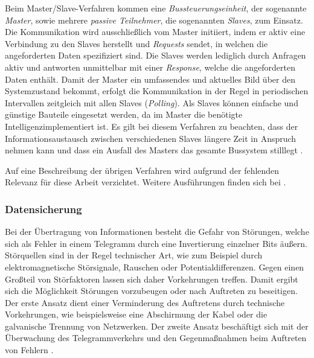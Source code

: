 Beim Master/Slave-Verfahren kommen eine \textit{Bussteuerungseinheit}, der sogenannte \textit{Master}, sowie mehrere \textit{passive Teilnehmer}, die sogenannten \textit{Slaves}, zum Einsatz.
Die Kommunikation wird ausschließlich vom Master initiiert, indem er aktiv eine Verbindung zu den Slaves herstellt und \textit{Requests} sendet, in welchen die angeforderten Daten spezifiziert sind.
Die Slaves werden lediglich durch Anfragen aktiv und antworten unmittelbar mit einer \textit{Response}, welche die angeforderten Daten enthält.
Damit der Master ein umfassendes und aktuelles Bild über den Systemzustand bekommt, erfolgt die Kommunikation in der Regel in periodischen Intervallen zeitgleich mit allen Slaves (\textit{Polling}). Als Slaves können einfache und günstige Bauteile eingesetzt werden, da im Master die benötigte \Gun Intelligenz\Gob implementiert ist. 
Es gilt bei diesem Verfahren zu beachten, dass der Informationsaustausch zwischen verschiedenen Slaves längere Zeit in Anspruch nehmen kann und dass ein Ausfall des Masters das gesamte Bussystem stilllegt \cite[S.~19ff.]{schn06}.

Auf eine Beschreibung der übrigen Verfahren wird aufgrund der fehlenden Relevanz für diese Arbeit verzichtet. Weitere Ausführungen finden sich bei \cite{schn06}.

\subsubsection{Datensicherung}

Bei der Übertragung von Informationen besteht die Gefahr von Störungen, welche sich als Fehler in einem Telegramm durch eine Invertierung einzelner Bits äußern. Störquellen sind in der Regel technischer Art, wie zum Beispiel durch elektromagnetische Störsignale, Rauschen oder Potentialdifferenzen. Gegen einen Großteil von Störfaktoren lassen sich daher Vorkehrungen treffen. Damit ergibt sich die Möglichkeit Störungen vorzubeugen oder nach Auftreten zu beseitigen. Der erste Ansatz dient einer Verminderung des Auftretens durch technische Vorkehrungen, wie beispielsweise eine Abschirmung der Kabel oder die galvanische Trennung von Netzwerken. Der zweite Ansatz beschäftigt sich mit der Überwachung des Telegrammverkehrs und den Gegenmaßnahmen beim Auftreten von Fehlern \cite[S.~30]{schn06}.

